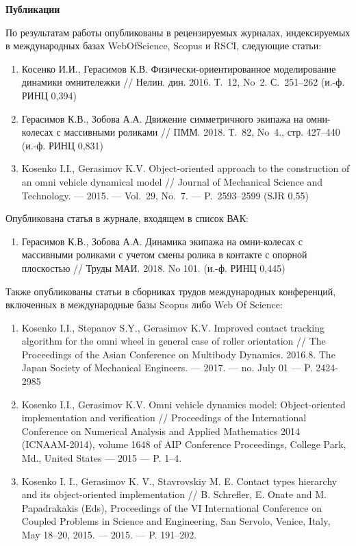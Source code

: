 
\textbf{Публикации}

По результатам работы опубликованы в рецензируемых журналах, индексируемых в международных базах WebOfScience, Scopus и RSCI, следующие статьи:

\begin{enumerate}
    \item Косенко И.И., Герасимов К.В. Физически-ориентированное моделирование динамики омнитележки // Нелин. дин. 2016. Т.~12, No~2. С.~251--262 (и.-ф. РИНЦ 0,394)
    \item Герасимов К.В., Зобова А.А. Движение симметричного экипажа на омни-колесах с массивными роликами // ПММ. 2018. Т.~82, No~4., стр. 427--440 (и.-ф. РИНЦ 0,831)
    \item Kosenko I.I., Gerasimov K.V. Object-oriented approach to the cons\-truc\-tion of an omni vehicle dynamical model // Journal of Mechanical Science and Technology. — 2015. — Vol.~29, No.~7. — P.~2593--2599 (SJR 0,55)
\end{enumerate}
Опубликована статья в журнале, входящем в список ВАК:
\begin{enumerate}
    \addtocounter{enumi}{3}
    \item Герасимов К.В., Зобова А.А. Динамика экипажа на омни-ко\-ле\-сах с массивными роликами с учетом смены ролика в контакте с опорной плоскостью // Труды МАИ. 2018. No 101. (и.-ф. РИНЦ 0,445)
\end{enumerate}
Также опубликованы статьи в сборниках трудов международных конференций, включенных в международные базы Scopus либо Web Of Science:
\begin{enumerate}
    \addtocounter{enumi}{4}
    \item Kosenko I.I., Stepanov S.Y., Gerasimov K.V. Improved contact tracking algorithm for the omni wheel in general case of roller orientation // The Proceedings of the Asian Conference on Multi\-bo\-dy Dynamics. 2016.8. The Japan Society of Mechanical Engineers. — 2017. — no. July 01 — P. 2424-2985
    \item Kosenko I.I., Gerasimov K.V. Omni vehicle dynamics model: Object-oriented implementation and verification // Proceedings of the International Conference on Numerical Analysis and Applied Mathe\-ma\-tics 2014 (ICNAAM-2014), volume 1648 of AIP Conference Pro\-cee\-dings, College Park, Md., United States — 2015 — P. 1–4.
    \item Kosenko I. I., Gerasimov K. V., Stavrovskiy M. E. Contact types hierarchy and its object-oriented implementation // B. Schrefler, E. Onate and M. Papadrakakis (Eds), Proceedings of the VI Inter\-na\-tional Conference on Coupled Problems in Science and Engineering, San Servolo, Venice, Italy, May 18–20, 2015. — 2015. — P. 191–202.
\end{enumerate}
